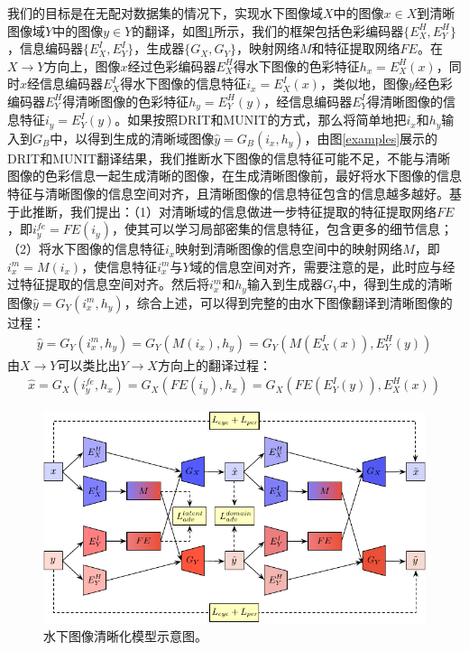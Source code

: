 我们的目标是在无配对数据集的情况下，实现水下图像域$X$中的图像$x\in X$到清晰图像域$Y$中的图像$y\in Y$的翻译，如图\ref{architecture_underwater}所示，我们的框架包括色彩编码器$\{E_X^H, E_Y^H\}$，信息编码器$\{E_X^I, E_Y^I\}$，生成器$\{G_X, G_Y\}$，映射网络$M$和特征提取网络$FE$。在$X\rightarrow Y$方向上，图像$x$经过色彩编码器$E_X^H$得水下图像的色彩特征$h_x=E_X^H(x)$，同时$x$经信息编码器$E_X^I$得水下图像的信息特征$i_x=E_X^I(x)$，类似地，图像$y$经色彩编码器$E_Y^H$得清晰图像的色彩特征$h_y=E_Y^H(y)$，经信息编码器$E_Y^I$得清晰图像的信息特征$i_y=E_Y^I(y)$。如果按照DRIT和MUNIT的方式，那么将简单地把$i_x$和$h_y$输入到$G_B$中，以得到生成的清晰域图像$\hat{y}=G_B(i_x, h_y)$，由图\ref{examples}展示的DRIT和MUNIT翻译结果，我们推断水下图像的信息特征可能不足，不能与清晰图像的色彩信息一起生成清晰的图像，在生成清晰图像前，最好将水下图像的信息特征与清晰图像的信息空间对齐，且清晰图像的信息特征包含的信息越多越好。基于此推断，我们提出：（1）对清晰域的信息做进一步特征提取的特征提取网络$FE$，即$i_y^{fe}=FE(i_y)$，使其可以学习局部密集的信息特征，包含更多的细节信息；（2）将水下图像的信息特征$i_x$映射到清晰图像的信息空间中的映射网络$M$，即$i_x^m=M(i_x)$，使信息特征$i_x^m$与$Y$域的信息空间对齐，需要注意的是，此时应与经过特征提取的信息空间对齐。然后将$i_x^m$和$h_y$输入到生成器$G_Y$中，得到生成的清晰图像$\hat{y}=G_Y(i_x^m, h_y)$，综合上述，可以得到完整的由水下图像翻译到清晰图像的过程：
\begin{equation}
\begin{split}
\hat{y}=G_Y(i_x^m, h_y)=G_Y(M(i_x), h_y)=G_Y(M(E_X^I(x)), E_Y^H(y))
\end{split}
\label{eq:underwater_X2Y}
\end{equation}
由$X\to Y$可以类比出$Y\to X$方向上的翻译过程：
\begin{equation}
\begin{split}
\hat{x}=G_X(i_y^{fe}, h_x)=G_X(FE(i_y), h_x)=G_X(FE(E_Y^I(y)), E_X^H(x))
\end{split}
\label{eq:underwater_X2Y}
\end{equation}

\begin{figure}[ht]
    \centering
	\includegraphics[width=\textwidth]{figs/architecture_underwater.pdf}
	\caption{水下图像清晰化模型示意图。}
	\label{architecture_underwater}
\end{figure}

